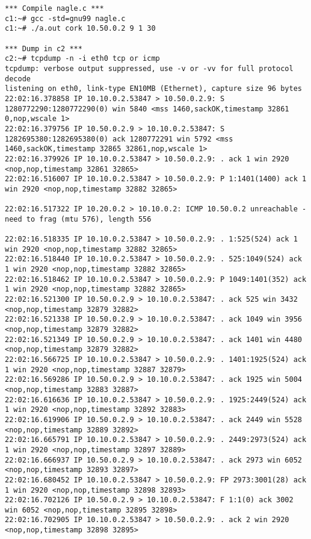 \documentclass[a4paper,12pt]{article}
\begin{document}
\begin{lstlisting}
*** Compile nagle.c ***
c1:~# gcc -std=gnu99 nagle.c
c1:~# ./a.out cork 10.50.0.2 9 1 30

*** Dump in c2 ***
c2:~# tcpdump -n -i eth0 tcp or icmp
tcpdump: verbose output suppressed, use -v or -vv for full protocol decode
listening on eth0, link-type EN10MB (Ethernet), capture size 96 bytes
22:02:16.378858 IP 10.10.0.2.53847 > 10.50.0.2.9: S 1280772290:1280772290(0) win 5840 <mss 1460,sackOK,timestamp 32861 0,nop,wscale 1>
22:02:16.379756 IP 10.50.0.2.9 > 10.10.0.2.53847: S 1282695380:1282695380(0) ack 1280772291 win 5792 <mss 1460,sackOK,timestamp 32865 32861,nop,wscale 1>
22:02:16.379926 IP 10.10.0.2.53847 > 10.50.0.2.9: . ack 1 win 2920 <nop,nop,timestamp 32861 32865>
22:02:16.516007 IP 10.10.0.2.53847 > 10.50.0.2.9: P 1:1401(1400) ack 1 win 2920 <nop,nop,timestamp 32882 32865>

22:02:16.517322 IP 10.20.0.2 > 10.10.0.2: ICMP 10.50.0.2 unreachable - need to frag (mtu 576), length 556

22:02:16.518335 IP 10.10.0.2.53847 > 10.50.0.2.9: . 1:525(524) ack 1 win 2920 <nop,nop,timestamp 32882 32865>
22:02:16.518440 IP 10.10.0.2.53847 > 10.50.0.2.9: . 525:1049(524) ack 1 win 2920 <nop,nop,timestamp 32882 32865>
22:02:16.518462 IP 10.10.0.2.53847 > 10.50.0.2.9: P 1049:1401(352) ack 1 win 2920 <nop,nop,timestamp 32882 32865>
22:02:16.521300 IP 10.50.0.2.9 > 10.10.0.2.53847: . ack 525 win 3432 <nop,nop,timestamp 32879 32882>
22:02:16.521338 IP 10.50.0.2.9 > 10.10.0.2.53847: . ack 1049 win 3956 <nop,nop,timestamp 32879 32882>
22:02:16.521349 IP 10.50.0.2.9 > 10.10.0.2.53847: . ack 1401 win 4480 <nop,nop,timestamp 32879 32882>
22:02:16.566725 IP 10.10.0.2.53847 > 10.50.0.2.9: . 1401:1925(524) ack 1 win 2920 <nop,nop,timestamp 32887 32879>
22:02:16.569286 IP 10.50.0.2.9 > 10.10.0.2.53847: . ack 1925 win 5004 <nop,nop,timestamp 32883 32887>
22:02:16.616636 IP 10.10.0.2.53847 > 10.50.0.2.9: . 1925:2449(524) ack 1 win 2920 <nop,nop,timestamp 32892 32883>
22:02:16.619906 IP 10.50.0.2.9 > 10.10.0.2.53847: . ack 2449 win 5528 <nop,nop,timestamp 32889 32892>
22:02:16.665791 IP 10.10.0.2.53847 > 10.50.0.2.9: . 2449:2973(524) ack 1 win 2920 <nop,nop,timestamp 32897 32889>
22:02:16.666937 IP 10.50.0.2.9 > 10.10.0.2.53847: . ack 2973 win 6052 <nop,nop,timestamp 32893 32897>
22:02:16.680452 IP 10.10.0.2.53847 > 10.50.0.2.9: FP 2973:3001(28) ack 1 win 2920 <nop,nop,timestamp 32898 32893>
22:02:16.702126 IP 10.50.0.2.9 > 10.10.0.2.53847: F 1:1(0) ack 3002 win 6052 <nop,nop,timestamp 32895 32898>
22:02:16.702905 IP 10.10.0.2.53847 > 10.50.0.2.9: . ack 2 win 2920 <nop,nop,timestamp 32898 32895>


\end{lstlisting}
\end{document}
